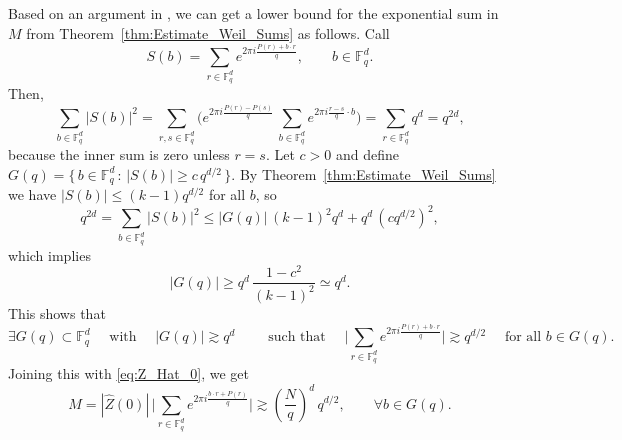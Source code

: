 \documentclass[11pt,reqno]{amsart}
\theoremstyle{definition}
\numberwithin{equation}{section}
\theoremstyle{remark}
\begin{document}
Based on an argument in \cite[Section 2.1]{AnChuPierce2023}, 
we can get a lower bound for the exponential sum in $M$ from Theorem~\ref{thm:Estimate_Weil_Sums} as follows. Call
\begin{equation}
    S(b) = \sum_{r \in \mathbb F^d_q} e^{2\pi i \frac{P(r) + b \cdot r}{q}}, 
    \qquad b \in \mathbb F_q^d. 
\end{equation}
Then, 
\begin{equation}
    \sum_{b \in \mathbb F_q^d} |S(b)|^2 
    = \sum_{r,s \in \mathbb F_q^d} \Big(  e^{2\pi i \frac{P(r) - P(s)}{q}}\, \sum_{b \in \mathbb F_q^d} e^{2\pi i \frac{r-s}{q} \cdot b} \Big)
    = \sum_{r \in \mathbb F_q^d} q^d = q^{2d}, 
\end{equation}
because the inner sum is zero unless $r=s$. 
Let $c > 0$ and define $G(q) = \{ \, b \in \mathbb F_q^d \, : \, |S(b)| \geq c \, q^{d/2}\,  \}$.
By Theorem~\ref{thm:Estimate_Weil_Sums} we have $|S(b)| \leq (k-1)q^{d/2}$ for all $b$, so 
\begin{equation}
    q^{2d} = \sum_{b \in \mathbb F_q^d} |S(b)|^2 \leq |G(q)| \,   (k-1)^2 q^d 
    + q^d \, ( c q^{d/2} )^2,  
\end{equation}
which implies 
\begin{equation}
    |G(q)| \geq q^d \, \frac{1 - c^2}{(k-1)^2} \simeq q^d.
\end{equation}
This shows that 
\begin{equation}\label{eq:Weil_Lower_Bound}
    \exists G(q) \subset \mathbb F_q^d \quad  \text{ with } \quad |G(q)| \gtrsim q^d 
    \qquad \text{ such that } \quad 
    \Big| \sum_{r \in \mathbb F^d_q} e^{2\pi i \frac{P(r) + b \cdot r}{q}} \Big| \gtrsim q^{d/2} \quad \text{ for all } b \in G(q).
\end{equation}
Joining this with \eqref{eq:Z_Hat_0}, we get
\begin{equation}\label{eq:Main_Term}
    M = |\widehat Z(0)| \, 
    \Big| \sum_{r \in \mathbb F_q^d}  e^{2 \pi  i \frac{b \cdot r + P(r)}{q}} \Big| 
    \gtrsim \left(\frac{N}{q} \right)^d\, q^{d/2}, 
    \qquad \forall b \in G(q). 
\end{equation}
\end{document}

